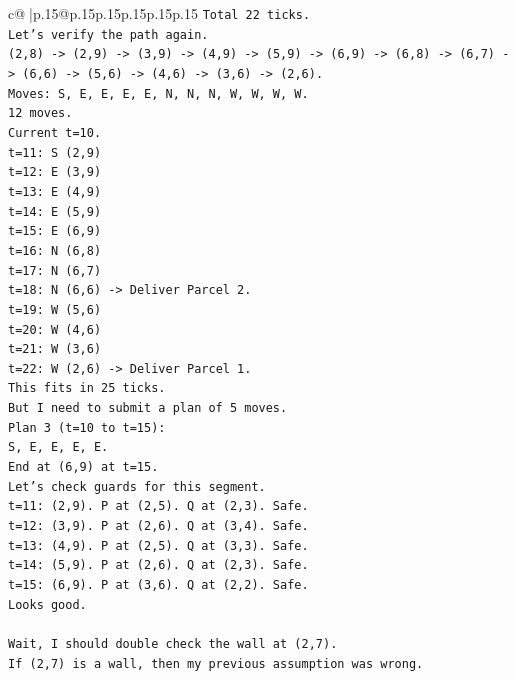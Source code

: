 \documentclass{article}
\begin{document}
{\begin{supertabular}{c@{$\;$}|p{.15\linewidth}@{}p{.15\linewidth}p{.15\linewidth}p{.15\linewidth}p{.15\linewidth}p{.15\linewidth}}
{{{\texttt{Total 22 ticks.} \\
\texttt{Let's verify the path again.} \\
\texttt{(2,8) {-}> (2,9) {-}> (3,9) {-}> (4,9) {-}> (5,9) {-}> (6,9) {-}> (6,8) {-}> (6,7) {-}> (6,6) {-}> (5,6) {-}> (4,6) {-}> (3,6) {-}> (2,6).} \\
\texttt{Moves: S, E, E, E, E, N, N, N, W, W, W, W.} \\
\texttt{12 moves.} \\
\texttt{Current t=10.} \\
\texttt{t=11: S (2,9)} \\
\texttt{t=12: E (3,9)} \\
\texttt{t=13: E (4,9)} \\
\texttt{t=14: E (5,9)} \\
\texttt{t=15: E (6,9)} \\
\texttt{t=16: N (6,8)} \\
\texttt{t=17: N (6,7)} \\
\texttt{t=18: N (6,6) {-}> Deliver Parcel 2.} \\
\texttt{t=19: W (5,6)} \\
\texttt{t=20: W (4,6)} \\
\texttt{t=21: W (3,6)} \\
\texttt{t=22: W (2,6) {-}> Deliver Parcel 1.} \\
\texttt{This fits in 25 ticks.} \\
\texttt{But I need to submit a plan of 5 moves.} \\
\texttt{Plan 3 (t=10 to t=15):} \\
\texttt{S, E, E, E, E.} \\
\texttt{End at (6,9) at t=15.} \\
\texttt{Let's check guards for this segment.} \\
\texttt{t=11: (2,9). P at (2,5). Q at (2,3). Safe.} \\
\texttt{t=12: (3,9). P at (2,6). Q at (3,4). Safe.} \\
\texttt{t=13: (4,9). P at (2,5). Q at (3,3). Safe.} \\
\texttt{t=14: (5,9). P at (2,6). Q at (2,3). Safe.} \\
\texttt{t=15: (6,9). P at (3,6). Q at (2,2). Safe.} \\
\texttt{Looks good.} \\
\\ 
\texttt{Wait, I should double check the wall at (2,7).} \\
\texttt{If (2,7) is a wall, then my previous assumption was wrong.} \\
}}}
\end{supertabular}}
\end{document}
